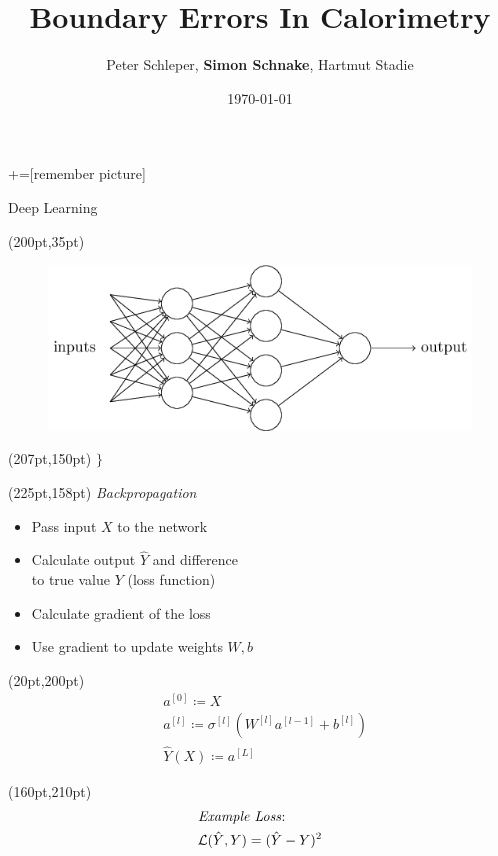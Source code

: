 \documentclass[10pt]{beamer}
\title{Boundary Errors In Calorimetry}
\date{\today}
\author{Peter Schleper, \textbf{Simon Schnake}, Hartmut Stadie}
\institute{Universität Hamburg}
\begin{document}
\maketitle
{}+=[remember picture]

\begin{frame}{Deep Learning}
  \begin{textblock*}{150pt}(200pt,35pt)
    \begin{figure}[htp]
      \includegraphics[width=\textwidth]{../images/tikz1.png}
    \end{figure}
  \end{textblock*}
  \begin{textblock*}{150pt}(207pt,150pt)
    \Huge{$\}$}
  \end{textblock*}
  \begin{textblock*}{150pt}(225pt,158pt)
    \emph{Backpropagation}
  \end{textblock*}
  \begin{itemize}
  \item Pass input $X$ to the network
  \item Calculate output $\hat{Y}$ and difference\\ to true value $Y$ (loss function)
  \item Calculate gradient of the loss
  \item Use gradient to update weights $W, b$
  \end{itemize}
  \begin{textblock*}{150pt}(20pt,200pt)
    \begin{align*}
      &a^{[0]} \coloneqq X \\
      &a^{[l]} \coloneqq \sigma^{[l]}(W^{[l]} a^{[l-1]}+ b^{[l]})\\
      &\hat{Y}(X) \coloneqq a^{[L]}
    \end{align*}
  \end{textblock*}

  \begin{textblock*}{170pt}(160pt,210pt)
    \begin{align*}
      &\text{\emph{Example Loss}:}\\
      &\mathcal{L}(\hat{Y}, Y) = (\hat{Y} - Y)^2
    \end{align*}
  \end{textblock*}
\end{frame}
\end{document}
